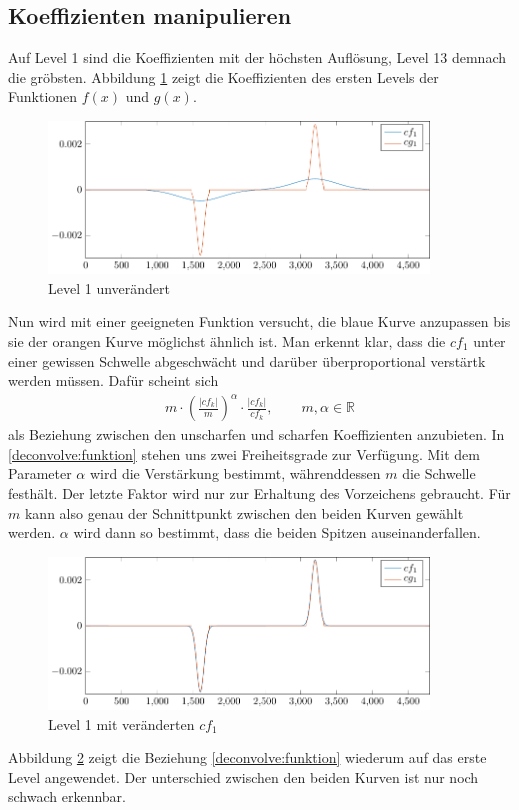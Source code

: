 \subsection{Koeffizienten manipulieren}
Auf Level 1 sind die Koeffizienten mit der höchsten Auflösung, Level 13 demnach die gröbsten.
Abbildung \ref{deconvolve:level1} zeigt die Koeffizienten des ersten Levels der Funktionen $f(x)$ und $g(x)$.
\begin{figure}[h]
\centering
\includegraphics[width=0.9\textwidth]{./papers/deconvolve/pictures/level/level1.pdf}
\caption{Level 1 unverändert\label{deconvolve:level1}}
\end{figure}
Nun wird mit einer geeigneten Funktion versucht, die blaue Kurve anzupassen bis sie der orangen Kurve möglichst ähnlich ist. Man erkennt klar, dass die $cf_1$ unter einer gewissen Schwelle abgeschwächt und darüber überproportional verstärtk werden müssen. Dafür scheint sich
\begin{align}
m\cdot \left(\frac{|cf_k|}{m}\right)^{\alpha}\cdot \frac{|cf_k|}{cf_k}, \qquad m,\alpha\in\mathbb{R}
\label{deconvolve:funktion}
\end{align}
als Beziehung zwischen den \glqq unscharfen\grqq{} und \glqq scharfen\grqq{} Koeffizienten anzubieten.
In \eqref{deconvolve:funktion} stehen uns zwei Freiheitsgrade zur Verfügung.
Mit dem Parameter $\alpha$ wird die Verstärkung bestimmt, währenddessen $m$ die Schwelle festhält.
Der letzte Faktor wird nur zur Erhaltung des Vorzeichens gebraucht.
Für $m$ kann also genau der Schnittpunkt zwischen den beiden Kurven gewählt werden.
$\alpha$ wird dann so bestimmt, dass die beiden Spitzen auseinanderfallen.
\begin{figure}[h]
\centering
\includegraphics[width=0.9\textwidth]{./papers/deconvolve/pictures/level/level1_n.pdf}
\caption{Level 1 mit veränderten $cf_1$\label{deconvolve:level1_n}}
\end{figure}
Abbildung \ref{deconvolve:level1_n} zeigt die Beziehung \eqref{deconvolve:funktion} wiederum auf das erste Level angewendet. Der unterschied zwischen den beiden Kurven ist nur noch schwach erkennbar.

